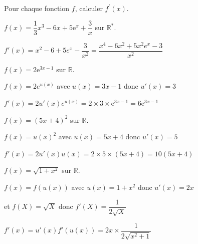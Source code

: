 \documentclass[11pt,a4paper]{article}  %
\begin{document}
	\graphicspath{{images/}}
	
	\begin{center}
		
		
		\fbox{
			\begin{minipage}[]{15cm}
				\begin{center}
					\LARGE{\rule{0.5cm}{0pt}\rule[-0.25cm]{0pt}{0.9cm}
						\textcolor{red}{Chapitre 01 - Dérivation\\
						Correction Exercices obligatoires}
					}
				\end{center}
			\end{minipage}
		}
	\end{center}

\exerciceDS{}

Pour chaque fonction $f$, calculer $f^{\prime}(x)$.
	\begin{enumMet}
	\item $f(x)=\dfrac{1}{3} x^3-6 x+5 \mathrm{e}^x+\dfrac{3}{x}$ sur $\mathbb{R}^*$.
	\begin{corrBox}
		$f'(x)=x^2-6+5e^x-\dfrac{3}{x^2}=\dfrac{x^4-6x^2+5x^2e^x-3}{x^2}$		
	\end{corrBox}
	\item $f(x)=2 \mathrm{e}^{3 x-1}$ sur $\mathbb{R}$.
	\begin{corrBox}
		$f(x)=2e^{u(x)}$ avec $u(x)=3x-1$ donc $u'(x)=3$
		
		$f'(x)=2u'(x)e^{u(x)}=2\times 3\times  \mathrm{e}^{3 x-1}= 6 \mathrm{e}^{3 x-1}$ 		
	\end{corrBox}
	\item $f(x)=(5 x+4)^2$ sur $\mathbb{R}$.
	\begin{corrBox}
		$f(x)=u(x)^2$ avec $u(x)=5x+4$ donc $u'(x)=5$
		
		$f'(x)=2u'(x)u(x)=2\times 5\times (5x+4)=10(5x+4)$		
	\end{corrBox}
	\item $f(x)=\sqrt{1+x^2}$ sur $\mathbb{R}$.
	\begin{corrBox}
		$f(x)=f(u(x))$ avec $u(x)=1+x^2$ donc $u'(x)=2x$
		
		\phantom{$f(x)=f(u(x))$} et $f(X)=\sqrt{X}$ donc $f'(X)=\dfrac{1}{2\sqrt{X}}$
		
		$f'(x)=u'(x)f'(u(x))=2x\times \dfrac{1}{2\sqrt{x^2+1}}$		
	\end{corrBox}
\end{enumMet}


\end{document}
